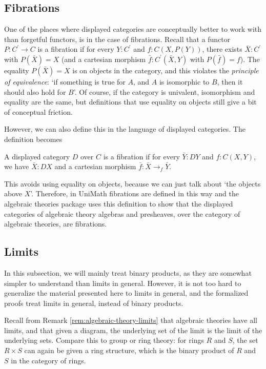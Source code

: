 \subsection{Fibrations}\label{subsec:fibrations}

One of the places where displayed categories are conceptually better to work with than forgetful functors, is in the case of fibrations. Recall that a functor $ P: C^\prime \to C $ is a fibration if for every $ Y : C^\prime $ and $ f : C(X, P(Y)) $, there exists $ \bar X : C^\prime $ with $ P(\bar X) = X $ (and a cartesian morphism $ \bar f : C^\prime(\bar X, Y) $ with $ P(\bar f) = f $). The equality $ P(\bar X) = X $ is on objects in the category, and this violates the \textit{principle of equivalence}: `if something is true for $ A $, and $ A $ is isomorphic to $ B $, then it should also hold for $ B $'. Of course, if the category is univalent, isomorphism and equality are the same, but definitions that use equality on objects still give a bit of conceptual friction.

However, we can also define this in the language of displayed categories. The definition becomes
\begin{definition}
  A displayed category $ D $ over $ C $ is a fibration if for every $ \bar Y : D Y $ and $ f: C(X, Y) $, we have $ \bar X : D X $ and a cartesian morphism $ \bar f : \bar X \to_f \bar Y $.
\end{definition}
This avoids using equality on objects, because we can just talk about `the objects above $ X $'. Therefore, in UniMath fibrations are defined in this way and the algebraic theories package uses this definition to show that the displayed categories of algebraic theory algebras and presheaves, over the category of algebraic theories, are fibrations.

\subsection{Limits}
In this subsection, we will mainly treat binary products, as they are somewhat simpler to understand than limits in general. However, it is not too hard to generalize the material presented here to limits in general, and the formalized proofs treat limits in general, instead of binary products.

Recall from Remark \ref{rem:algebraic-theory-limits} that algebraic theories have all limits, and that given a diagram, the underlying set of the limit is the limit of the underlying sets. Compare this to group or ring theory: for rings $ R $ and $ S $, the set $ R \times S $ can again be given a ring structure, which is the binary product of $ R $ and $ S $ in the category of rings.

